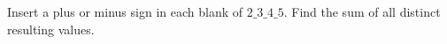 Insert a plus or minus sign in each blank of $2\_3\_4\_5$. Find the sum of all distinct resulting values.
